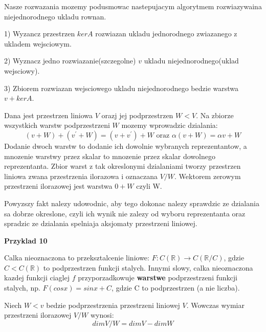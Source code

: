 \documentclass{article}
\begin{document}
\begin{tcolorbox}[colback=white!90!yellow,colframe=black!15!yellow,title=Algorytm]
Nasze rozwazania mozemy podusmowac nastepujacym algorytmem rozwiazywaina niejednorodnego ukladu rownan.

1) Wyzancz przestrzen $kerA$ rozwiazan ukladu jednorodnego zwiazanego z ukladem wejsciowym.

2) Wyznacz jedno rozwiazanie(szczegolne) $v$ ukladu niejednorodnego(uklad wejsciowy).

3) Zbiorem rozwiazan wejsciowego ukladu niejednorodnego bedzie warstwa $v + kerA$.

\end{tcolorbox}

\begin{tcolorbox}[colback=white!90!red,colframe=black!35!red,title=Fakt 2.46 Przestrzen ilorazowa]
Dana jest przestrzen liniowa $V$ orazj jej podprzestrzen $W<V$. Na zbiorze wszystkich warstw podprzestrzeni $W$ mozemy wprowadzic dzialania:
$$(v + W) + (v^{'} + W) = (v + v^{'}) + W \text{ oraz } \alpha(v + W) = \alpha v + W$$
Dodanie dwoch warstw to dodanie ich dowolnie wybranych reprezentantow, a mnozenie warstwy przez skalar to mnozenie przez skalar dowolnego reprezentanta. Zbior warst z tak okreslonymi dzialaniami tworzy przestrzen liniowa zwana przestrzenia ilorazowa i oznaczana $V/W$. Wektorem zerowym przestrzeni ilorazowej jest warstwa $0 + W$ czyli W.

\end{tcolorbox}
Powyzszy fakt nalezy udowodnic, aby tego dokonac nalezy sprawdzic ze dzialania sa dobrze okreslone, czyli ich wynik nie zalezy od wyboru reprezentanta oraz spradzic ze dzialania spelniaja aksjomaty przestrzeni liniowej.

\textbf{Przyklad 10}

Calka nieoznaczona to przeksztalcenie liniowe: $F: C(\mathbb{R}) \rightarrow C(\mathbb{R}/C)$, gdzie $C < C(\mathbb{R})$ to podprzestrzen funkcji stalych. Innymi slowy, calka nieoznaczona kazdej funkcji ciaglej $f$ przyporzadkowuje \textbf{warstwe} podprzestrzeni funkcji stalych, np. $F(cosx) =  sinx + C$, gdzie C to podprzestrzen (a nie liczba).

\begin{tcolorbox}[colback=white!90!green,colframe=black!35!green,title=Fakt 2.47 Wymiar przestrzeni ilorazowej]
Niech $W<v$ bedzie podprzestrzenia przestrzeni liniowej $V$. Wowczas wymiar przestrzeni ilorazowej $V/W$ wynosi:$$dimV/W = dimV - dimW$$

\end{tcolorbox}
\end{document}
